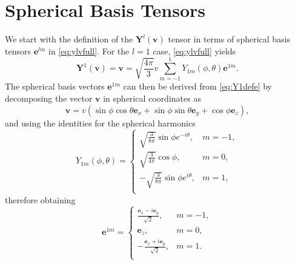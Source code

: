 \chapter{Spherical Basis Tensors}
\label{app:basistensors}

We start with the definition of the $\mathbf{Y}^l(\mathbf v)$ tensor in terms of spherical basis tensors $\mathbf e^{lm}$ in \cref{eq:ylvfull}.
%
For the $l=1$ case, \cref{eq:ylvfull} yields
%
\begin{equation}
    \mathbf Y^1(\mathbf v) = \mathbf v = \sqrt{\frac{4 \pi}{3}}v \sum_{m=-1}^1 Y_{1m}(\phi,\theta) \mathbf e^{1m}.
\label{eq:Y1defe}
\end{equation}
%
The spherical basis vectors $\mathbf e^{1m}$ can then be derived from \cref{eq:Y1defe} by decomposing the vector $\mathbf v$ in spherical coordinates as
%
\begin{equation}
    \mathbf v = v\left(\sin \phi \cos \theta \mathbf e_x+\sin \phi \sin \theta \mathbf e_y+\cos \phi \mathbf e_z\right),
\end{equation}
%
and using the identities for the spherical harmonics
%
\begin{equation}
    Y_{1m}(\phi,\theta)=
\begin{cases}
    \sqrt{\frac{3}{8 \pi}}\sin \phi e^{-i \theta}, &m=-1,\\
    \sqrt{\frac{3}{4 \pi}}\cos \phi, &m=0,\\
    -\sqrt{\frac{3}{8 \pi}}\sin \phi e^{i \theta}, &m=1,\\
\end{cases}
\end{equation}
%
therefore obtaining
%
\begin{equation}
    \mathbf e^{1m}=
\begin{cases}
    \frac{\mathbf e_x-i \mathbf e_y}{\sqrt{2}}, &m=-1,\\
    \mathbf e_z, &m=0,\\
    -\frac{\mathbf e_x+i \mathbf e_y}{\sqrt{2}}, &m=1.\\
\end{cases}
\end{equation}


